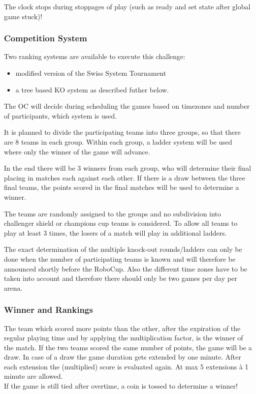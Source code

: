 The clock stops during stoppages of play (such as ready and set state after global game stuck)!

\subsubsection{Competition System}
Two ranking systems are available to execute this challenge: 
\begin{itemize}
    \item modified version of the Swiss System Tournament
    \item a tree based KO system as described futher below.
\end{itemize} 

The OC will decide during scheduling the games based on timezones and number of participants, which system is used.

It is planned to divide the participating teams into three groups, so that there are 8 teams in each group. Within each group, a ladder system will be used where only the winner of the game will advance. 

In the end there will be 3 winners from each group, who will determine their final placing in matches each against each other. If there is a draw between the three final teams, the points scored in the final matches will be used to determine a winner.

The teams are randomly assigned to the groups and no subdivision into challenger shield or champions cup teams is considered.
To allow all teams to play at least 3 times, the losers of a match will play in additional ladders.

The exact determination of the multiple knock-out rounds/ladders can only be done when the number of participating teams is known and will therefore be announced shortly before the RoboCup. Also the different time zones have to be taken into account and therefore there should only be two games per day per arena.
    
\subsubsection{Winner and Rankings}
\label{sec:rankings}

The team which scored more points than the other, after the expiration of the regular playing time and by applying the multiplication factor, is the winner of the match. If the two teams scored the same number of points, the game will be a draw. In case of a draw the game duration gets extended by one minute. After each extension the (multiplied) score is evaluated again. At max 5 extensions à 1 minute are allowed. \\
If the game is still tied after overtime, a coin is tossed to determine a winner!    

